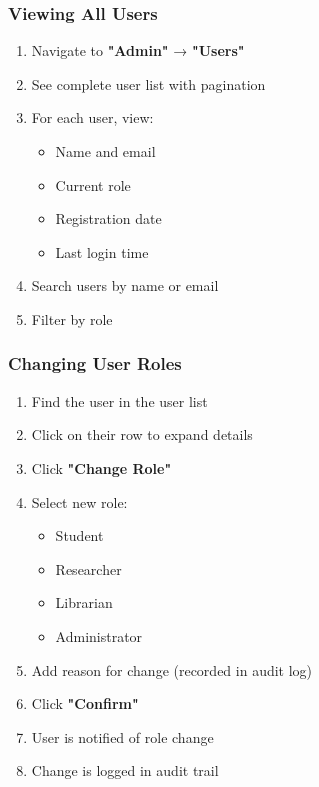 \documentclass[12pt,a4paper]{article}
\begin{document}
\subsubsection{Viewing All Users}
\begin{enumerate}[leftmargin=*]
    \item Navigate to \textbf{"Admin"} → \textbf{"Users"}
    \item See complete user list with pagination
    \item For each user, view:
        \begin{itemize}
            \item Name and email
            \item Current role
            \item Registration date
            \item Last login time
        \end{itemize}
    \item Search users by name or email
    \item Filter by role
\end{enumerate}

\subsubsection{Changing User Roles}
\begin{enumerate}[leftmargin=*]
    \item Find the user in the user list
    \item Click on their row to expand details
    \item Click \textbf{"Change Role"}
    \item Select new role:
        \begin{itemize}
            \item Student
            \item Researcher
            \item Librarian
            \item Administrator
        \end{itemize}
    \item Add reason for change (recorded in audit log)
    \item Click \textbf{"Confirm"}
    \item User is notified of role change
    \item Change is logged in audit trail
\end{enumerate}
\end{document}
